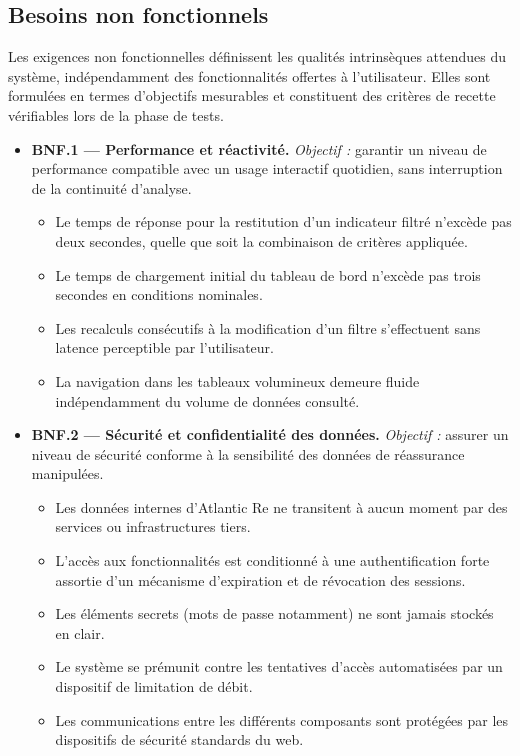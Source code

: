 \documentclass[../main.tex]{subfiles}
\begin{document}
\subsection{Besoins non fonctionnels}

Les exigences non fonctionnelles définissent les qualités intrinsèques attendues du système, indépendamment des fonctionnalités offertes à l'utilisateur. Elles sont formulées en termes d'objectifs mesurables et constituent des critères de recette vérifiables lors de la phase de tests.

\begin{itemize}[leftmargin=1.5cm, itemsep=6pt]

  \item \textbf{BNF.1 --- Performance et réactivité.}
  \emph{Objectif :} garantir un niveau de performance compatible avec un usage interactif quotidien, sans interruption de la continuité d'analyse.
  \begin{itemize}[label=\textendash, itemsep=2pt]
    \item Le temps de réponse pour la restitution d'un indicateur filtré n'excède pas deux secondes, quelle que soit la combinaison de critères appliquée.
    \item Le temps de chargement initial du tableau de bord n'excède pas trois secondes en conditions nominales.
    \item Les recalculs consécutifs à la modification d'un filtre s'effectuent sans latence perceptible par l'utilisateur.
    \item La navigation dans les tableaux volumineux demeure fluide indépendamment du volume de données consulté.
  \end{itemize}

  \item \textbf{BNF.2 --- Sécurité et confidentialité des données.}
  \emph{Objectif :} assurer un niveau de sécurité conforme à la sensibilité des données de réassurance manipulées.
  \begin{itemize}[label=\textendash, itemsep=2pt]
    \item Les données internes d'Atlantic Re ne transitent à aucun moment par des services ou infrastructures tiers.
    \item L'accès aux fonctionnalités est conditionné à une authentification forte assortie d'un mécanisme d'expiration et de révocation des sessions.
    \item Les éléments secrets (mots de passe notamment) ne sont jamais stockés en clair.
    \item Le système se prémunit contre les tentatives d'accès automatisées par un dispositif de limitation de débit.
    \item Les communications entre les différents composants sont protégées par les dispositifs de sécurité standards du web.
  \end{itemize}


\end{itemize}
\end{document}
